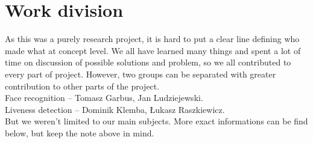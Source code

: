\chapter{Work division}
    As this was a purely research project, it is hard to
    put a clear line defining who made what at concept level.
    We all have learned many things and spent a lot of time
    on discussion of possible solutions and problem,
    so we all contributed to every part of project.
    However, two groups can be separated
    with greater contribution to other parts of the project.\\
    Face recognition -- Tomasz Garbus, Jan Ludziejewski.\\
    Liveness detection -- Dominik Klemba, Łukasz Raszkiewicz.\\
    But we weren't limited to our main subjects.
    More exact informations can be find below, but keep the note above in mind.

